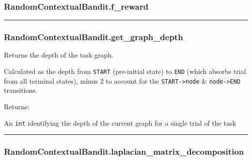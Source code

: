 \hypertarget{randomcontextualbandit.f_reward}{%
\subsubsection{RandomContextualBandit.f\_reward}\label{randomcontextualbandit.f_reward}}

\begin{Shaded}
\begin{Highlighting}[]
\end{Highlighting}
\end{Shaded}

\begin{center}\rule{0.5\linewidth}{\linethickness}\end{center}

\hypertarget{randomcontextualbandit.get_graph_depth}{%
\subsubsection{RandomContextualBandit.get\_graph\_depth}\label{randomcontextualbandit.get_graph_depth}}

\begin{Shaded}
\begin{Highlighting}[]
\NormalTok{)}
\end{Highlighting}
\end{Shaded}

Returns the depth of the task graph.

Calculated as the depth from \texttt{START} (pre-initial state) to
\texttt{END} (which absorbs trial from all terminal states), minus 2 to
account for the \texttt{START-\textgreater{}node} \&
\texttt{node-\textgreater{}END} transitions.

Returns:

An \texttt{int} identifying the depth of the current graph for a single
trial of the task

\begin{center}\rule{0.5\linewidth}{\linethickness}\end{center}

\hypertarget{randomcontextualbandit.laplacian_matrix_decomposition}{%
\subsubsection{RandomContextualBandit.laplacian\_matrix\_decomposition}\label{randomcontextualbandit.laplacian_matrix_decomposition}}

